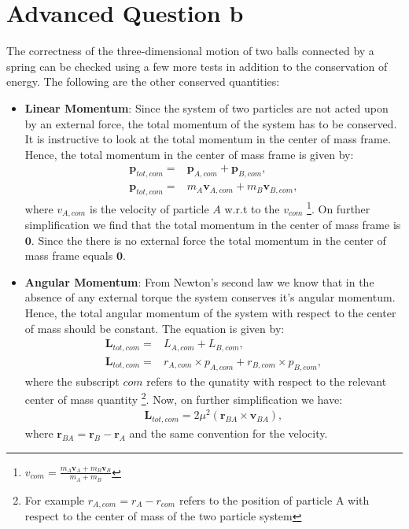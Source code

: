 \documentclass[10pt]{article}
\begin{document}
\section*{Advanced Question b}
The correctness of the three-dimensional motion of two balls connected by a spring can be checked using a few more tests in addition to the conservation of energy. The following are the other conserved quantities:
\begin{itemize}
\item \textbf{Linear Momentum}: Since the system of two particles are not acted upon by an external force, the total momentum of the system has to be conserved. It is instructive to look at the total momentum in the center of mass frame. Hence, the total momentum in the center of mass frame is given by:
\begin{eqnarray}
\bm{p}_{tot, com} =& \bm{p}_{A, com} + \bm{p}_{B, com}, \\
\bm{p}_{tot, com} =& m_{A}\bm{v}_{A, com} + m_{B}\bm{v}_{B, com},
\end{eqnarray}
where $v_{A, com}$ is the velocity of particle $A$ w.r.t to the $v_{com}$ \footnote{$v_{com} = \frac{m_{A}\bm{v}_{A} + m_{B}\bm{v}_{B}}{m_{A}+m_{B}}$}. On further simplification we find that the total momentum in the center of mass frame is $\bm{0}$. Since the there is no external force the total momentum in the center of mass frame equals $\bm{0}$.  
\item \textbf{Angular Momentum}: From Newton's second law we know that in the absence of any external torque the system conserves it's angular momentum. Hence, the total angular momentum of the system with respect to the center of mass should be constant. The equation is given by:
\begin{eqnarray}
\bm{L}_{tot,com} =& L_{A,com} + L_{B,com},\\
\bm{L}_{tot,com} =& r_{A,com}\times p_{A,com} + r_{B,com}\times p_{B,com},
\end{eqnarray}
where the subscript $com$ refers to the qunatity with respect to the relevant center of mass quantity \footnote{For example $r_{A,com} = r_{A} - r_{com}$ refers to the position of particle A with respect to the center of mass of the two particle system}. Now, on further simplification we have:
\begin{eqnarray}
\bm{L}_{tot,com} = 2 \mu^2 (\bm{r}_{BA} \times \bm{v}_{BA}),
\end{eqnarray}
where $\bm{r}_{BA} = \bm{r}_{B} - \bm{r}_{A}$ and the same convention for the velocity. 
\end{itemize}
\end{document}
